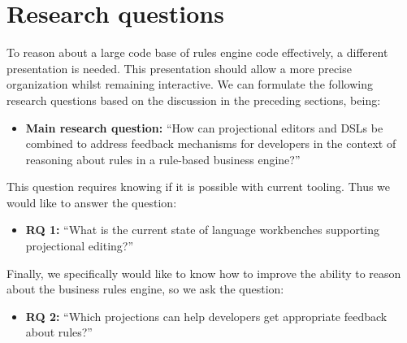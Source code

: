 \section{Research questions}\label{section:Research_Questions}

To reason about a large code base of rules engine code effectively, a different presentation is needed.
This presentation should allow a more precise organization whilst remaining interactive.
We can formulate the following research questions based on the discussion in the preceding sections, being:

\begin{itemize}
    \item \textbf{Main research question:} ``How can projectional editors and DSLs be combined to address feedback mechanisms for developers in the context of reasoning about rules in a rule-based business engine?''
\end{itemize}

This question requires knowing if it is possible with current tooling. Thus we would like to answer the question:
\begin{itemize}
    \item \textbf{RQ 1:} ``What is the current state of language workbenches supporting projectional editing?''
\end{itemize}

Finally, we specifically would like to know how to improve the ability to reason about the business rules engine, so we ask the question:
\begin{itemize}
    \item \textbf{RQ 2:} ``Which projections can help developers get appropriate feedback about rules?''
\end{itemize}
